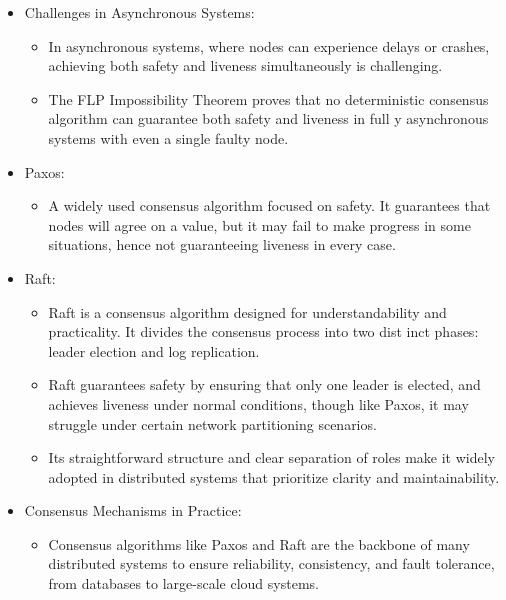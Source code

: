 \begin{itemize}
\begin{itemize}
	      \end{itemize}
	\item Challenges in Asynchronous Systems:
	      \begin{itemize}
		      \item In asynchronous systems, where nodes can experience delays or crashes, achieving both safety and liveness simultaneously is challenging.
		      \item The FLP Impossibility Theorem proves that no deterministic consensus algorithm can guarantee both safety and liveness in full y asynchronous systems with even a single faulty node.
	      \end{itemize}
	\item Paxos:
	      \begin{itemize}
		      \item A widely used consensus algorithm focused on safety. It guarantees that nodes will agree on a value, but it may fail to make progress in some situations, hence not guaranteeing liveness in every case.
	      \end{itemize}
	\item Raft:
	      \begin{itemize}
		      \item Raft is a consensus algorithm designed for understandability and practicality. It divides the consensus process into two dist inct phases: leader election and log replication.
		      \item Raft guarantees safety by ensuring that only one leader is elected, and achieves liveness under normal conditions, though like Paxos, it may struggle under certain network partitioning scenarios.
		      \item Its straightforward structure and clear separation of roles make it widely adopted in distributed systems that prioritize clarity and
		            maintainability.

	      \end{itemize}
	\item Consensus Mechanisms in Practice:
	      \begin{itemize}
		      \item Consensus algorithms like Paxos and Raft are the backbone of many distributed systems to ensure reliability, consistency, and fault tolerance, from databases to large-scale cloud systems.
	      \end{itemize}
\end{itemize}